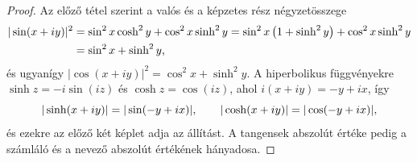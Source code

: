 \documentclass[11pt]{scrartcl}
\theoremstyle{definition}
\theoremstyle{remark}
\begin{document}
\begin{proof}
	Az előző tétel szerint a valós és a képzetes rész négyzetösszege
	\[
		\begin{aligned}
			|\sin(x + iy)|^2 & = \sin^2 x \cosh^2 y + \cos^2 x \sinh^2 y
			= \sin^2 x \left(1 + \sinh^2 y\right) + \cos^2 x \sinh^2 y \\
			                 & = \sin^2 x + \sinh^2 y\text,
		\end{aligned}
	\]
	és ugyanígy $|\cos(x + iy)|^2 = \cos^2 x + \sinh^2 y$. A hiperbolikus
	függvényekre $\sinh z = -i \sin(iz)$ és $\cosh z = \cos(iz)$, ahol
	$i(x + iy) = -y + ix$, így
	\[
		|\sinh(x + iy)| = |\sin(-y + ix)|, \qquad
		|\cosh(x + iy)| = |\cos(-y + ix)|\text,
	\]
	és ezekre az előző két képlet adja az állítást. A tangensek abszolút
	értéke pedig a számláló és a nevező abszolút értékének hányadosa.
\end{proof}
\end{document}
